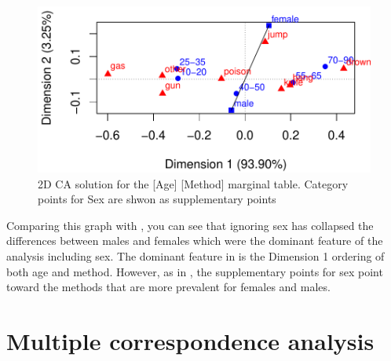 \documentclass[11pt]{book}
\renewenvironment{knitrout}{\small\renewcommand{\baselinestretch}{.85}}{} %
\begin{document}
\begin{knitrout}
\color{fgcolor}\begin{kframe}
\begin{alltt}
 \hlkwb{<-} \hlstd{(}\hlstd{=}\hlstd{,} \hlstd{=}\hlstd{(}\hlstd{,}\hlstd{,}\hlstd{,}\hlstd{)}\hlopt{+}\hlstd{)}
 \hlkwb{<-}  \hlstd{=}\hlstd{(}\hlstd{,} \hlstd{,} \hlstd{,} \hlstd{))}
\hlopt{$}\hlstd{rows[}\hlopt{:}\hlstd{,])}
\end{alltt}
\end{kframe}\begin{figure}[!htbp]


\centerline{\includegraphics[width=.9\textwidth]{ch06/fig/ca-suicide-sup} }

\caption[2D CA solution for the Age Method marginal table]{2D CA solution for the [Age] [Method] marginal table. Category points for Sex are shwon as supplementary points\label{fig:ca-suicide-sup}}
\end{figure}


\end{knitrout}
Comparing this graph with ,
you can see that ignoring sex has collapsed the differences between
males and females which were the dominant feature of the analysis
including sex.  The dominant feature in 
is the Dimension 1 ordering of both age and method.
However, as in , the supplementary points for sex
point toward the methods that are more prevalent for females
and males.


\section{Multiple correspondence analysis}\label{sec:mca}
\end{document}
